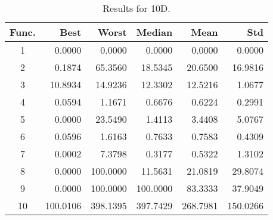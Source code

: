 \begin{table}[ht]
\centering
\caption{ Results for 10D. }
\label{tab:10D}
\begin{tabular}{crrrrr}
\hline
{Func.} & Best & Worst & Median & Mean & Std \\
\hline
1 & 0.0000 & 0.0000 & 0.0000 & 0.0000 & 0.0000 \\
2 & 0.1874 & 65.3560 & 18.5345 & 20.6500 & 16.9816 \\
3 & 10.8934 & 14.9236 & 12.3302 & 12.5216 & 1.0677 \\
4 & 0.0594 & 1.1671 & 0.6676 & 0.6224 & 0.2991 \\
5 & 0.0000 & 23.5490 & 1.4113 & 3.4408 & 5.0767 \\
6 & 0.0596 & 1.6163 & 0.7633 & 0.7583 & 0.4309 \\
7 & 0.0002 & 7.3798 & 0.3177 & 0.5322 & 1.3102 \\
8 & 0.0000 & 100.0000 & 11.5631 & 21.0819 & 29.8074 \\
9 & 0.0000 & 100.0000 & 100.0000 & 83.3333 & 37.9049 \\
10 & 100.0106 & 398.1395 & 397.7429 & 268.7981 & 150.0266 \\
\hline
\end{tabular}
\end{table}
